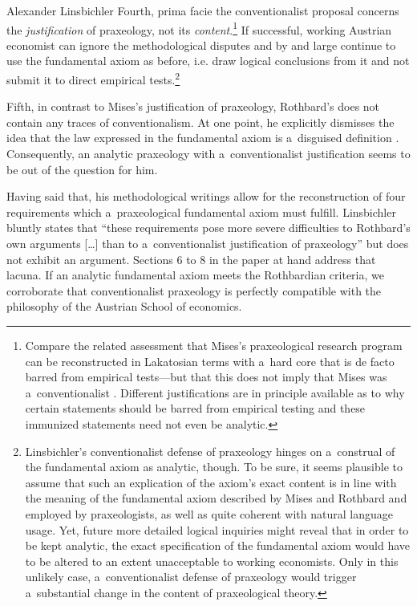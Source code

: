 \begin{artengenv}{Alexander Linsbichler}
Fourth, prima facie the conventionalist proposal concerns the \textit{justification} of praxeology, not its \textit{content}.\footnote{Compare the related assessment that Mises's praxeological research program can be reconstructed in Lakatosian terms with a~hard core that is de facto barred from empirical tests---but that this does not imply that Mises was a~conventionalist 
\parencite[see][]{zanotti_can_2022}. %
 Different justifications are in principle available as to why certain statements should be barred from empirical testing and these immunized statements need not even be analytic.} If successful, working Austrian economist can ignore the methodological disputes and by and large continue to use the fundamental axiom as before, i.e. draw logical conclusions from it and not submit it to direct empirical tests.\footnote{Linsbichler's 
\parencites*[][]{linsbichler_was_2017}[][]{linsbichler_austrian_2021} %
 conventionalist defense of praxeology hinges on a~construal of the fundamental axiom as analytic, though. To be sure, it seems plausible to assume that such an explication of the axiom's exact content is in line with the meaning of the fundamental axiom described by Mises and Rothbard and employed by praxeologists, as well as quite coherent with natural language usage. Yet, future more detailed logical inquiries might reveal that in order to be kept analytic, the exact specification of the fundamental axiom would have to be altered to an extent unacceptable to working economists. Only in this unlikely case, a~conventionalist defense of praxeology would trigger a~substantial change in the content of praxeological theory.}



Fifth, in contrast to Mises's justification of praxeology, Rothbard's does not contain any traces of conventionalism. At one point, he explicitly dismisses the idea that the law expressed in the fundamental axiom is a~disguised definition 
\parencite[][p.318]{rothbard_defense_1957}. %
 Consequently, an analytic praxeology with a~conventionalist justification seems to be out of the question for him.



Having said that, his methodological writings allow for the reconstruction of four requirements which a~praxeological fundamental axiom must fulfill. Linsbichler 
\parencite*[][p.3376]{linsbichler_austrian_2021} %
 bluntly states that ``these requirements pose more severe difficulties to Rothbard's own arguments […] than to a~conventionalist justification of praxeology'' but does not exhibit an argument. Sections 6 to 8 in the paper at hand address that lacuna. If an analytic fundamental axiom meets the Rothbardian criteria, we corroborate that conventionalist praxeology is perfectly compatible with the philosophy of the Austrian School of economics.




\end{artengenv}
